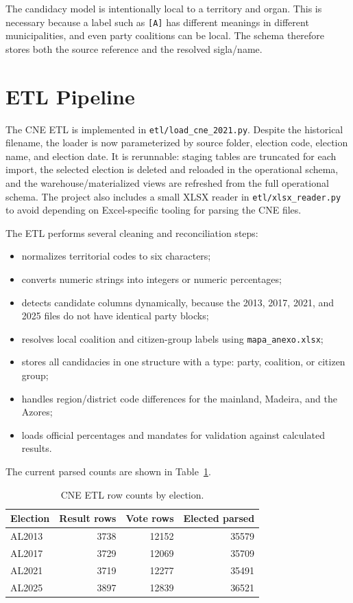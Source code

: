 \documentclass[11pt,twocolumn]{article}
\begin{document}
The candidacy model is intentionally local to a territory and organ. This is necessary because a label such as \texttt{[A]} has different meanings in different municipalities, and even party coalitions can be local. The schema therefore stores both the source reference and the resolved sigla/name.

\section{ETL Pipeline}

The CNE ETL is implemented in \texttt{etl/load\_cne\_2021.py}. Despite the historical filename, the loader is now parameterized by source folder, election code, election name, and election date. It is rerunnable: staging tables are truncated for each import, the selected election is deleted and reloaded in the operational schema, and the warehouse/materialized views are refreshed from the full operational schema. The project also includes a small XLSX reader in \texttt{etl/xlsx\_reader.py} to avoid depending on Excel-specific tooling for parsing the CNE files.

The ETL performs several cleaning and reconciliation steps:

\begin{itemize}
  \item normalizes territorial codes to six characters;
  \item converts numeric strings into integers or numeric percentages;
  \item detects candidate columns dynamically, because the 2013, 2017, 2021, and 2025 files do not have identical party blocks;
  \item resolves local coalition and citizen-group labels using \texttt{mapa\_anexo.xlsx};
  \item stores all candidacies in one structure with a type: party, coalition, or citizen group;
  \item handles region/district code differences for the mainland, Madeira, and the Azores;
  \item loads official percentages and mandates for validation against calculated results.
\end{itemize}

The current parsed counts are shown in Table~\ref{tab:counts}.

\begin{table}[h]
\centering
\caption{CNE ETL row counts by election.}
\label{tab:counts}
\begin{tabular}{lrrr}
\toprule
Election & Result rows & Vote rows & Elected parsed\\
\midrule
AL2013 & 3738 & 12152 & 35579\\
AL2017 & 3729 & 12069 & 35709\\
AL2021 & 3719 & 12277 & 35491\\
AL2025 & 3897 & 12839 & 36521\\
\bottomrule
\end{tabular}
\end{table}
\end{document}
